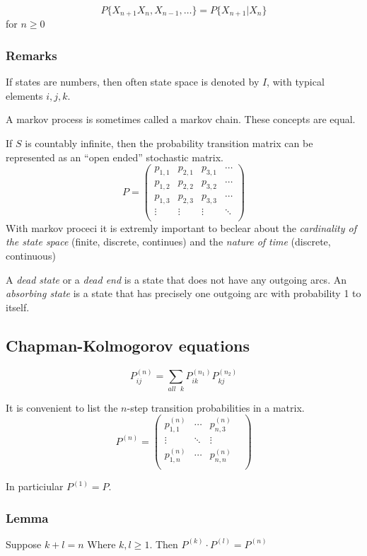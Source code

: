 \documentclass{article}
\begin{document}
\[ P\{ X_{n+1} X_n, X_{n-1}, \dots\}=P\{X_{n+1}|X_n\}\]
for $n \ge 0$

\subsubsection{Remarks}
If states are numbers, then often state space is denoted by $I$, with 
typical elements $i,j,k$.

A markov process is sometimes called a markov chain. These concepts are
equal.

If $S$ is countably infinite, then the probability transition matrix
can be represented as an ``open ended'' stochastic matrix.
\[
	P =
\begin{pmatrix}
	p_{1,1}	& p_{2,1}	& p_{3,1} & \cdots\\
	p_{1,2}	& p_{2,2}	& p_{3,2}	& \cdots\\
	p_{1,3}	& p_{2,3}	& p_{3,3}	& \cdots\\
	\vdots	& \vdots	& \vdots		& \ddots \\
\end{pmatrix}
\]
With markov proceci it is extremly important to beclear about the
\emph{cardinality of the state space} (finite, discrete, continues) and
the \emph{nature of time} (discrete, continuous)

A \emph{dead state} or a \emph{dead end} is a state that does not have
any outgoing arcs. An \emph{absorbing  state} is a state that has precisely
one outgoing arc with probability 1 to itself.

\subsection{Chapman-Kolmogorov equations}

\[P^{(n)}_{ij} = \sum_{all\mbox{\ }k} P^{(n_1)}_{ik} P^{(n_2)}_{kj} \]

It is convenient to list the $n$-step transition probabilities in a matrix.
\[
	P^{(n)} =
\begin{pmatrix}
	p^{(n)}_{1,1}	& \cdots	& p^{(n)}_{n,3} 	& \\
	\vdots	& \ddots	& \vdots	& \\
	p^{(n)}_{1,n}	& \cdots	& p^{(n)}_{n,n}	& \\
\end{pmatrix}
\]

In particiular $P^{(1)} = P$.

\subsubsection{Lemma}
Suppose $k+l=n$ Where $k,l\ge1$. Then $P^{(k)} \cdot P^{(l)} = P^{(n)}$
\end{document}
